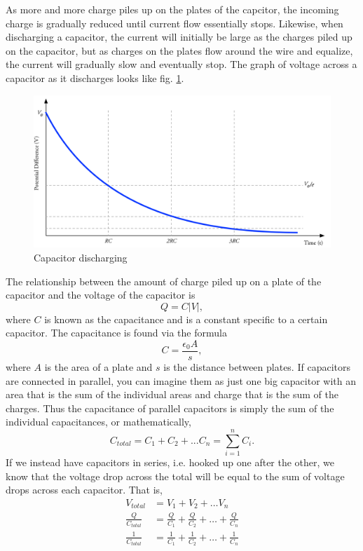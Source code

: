 \documentclass[nobib]{tufte-handout}
\begin{document}
As more and more charge piles up on the plates of the capcitor, the incoming charge is 
gradually reduced until current flow essentially stops. Likewise, when discharging a capacitor, 
the current will initially be large as the charges piled up on the capacitor, but as charges 
on the plates flow around the wire and equalize, the current will gradually slow and eventually stop. 
The graph of voltage across a capacitor as it discharges looks like fig. \ref{fig:capdis}.
\begin{figure}
    \center 
    \caption{Capacitor discharging}
    \label{fig:capdis}
    \includegraphics{images/Capacitor-discharge-curve.png}
\end{figure}
The relationship between the amount of charge piled up 
on a plate of the capacitor and the voltage of the capacitor is 
\[Q = C|V|,\]
where $C$ is known as the capacitance and is a constant specific to 
a certain capacitor. 
The capacitance is found via the formula 
\[C = \frac{\epsilon_0 A}{s},\]
where $A$ is the area of a plate and $s$ is the distance between plates. 
If capacitors are connected in parallel, you can imagine them as just one 
big capacitor with an area that is the sum of the individual areas and 
charge that is the sum of the charges. Thus the capacitance of parallel
capacitors is simply the sum of the individual capacitances, or mathematically, 
\[C_{total} = C_1 + C_2 + ... C_n = \sum_{i=1}^{n} C_i.\]
If we instead have capacitors in series, i.e. hooked up one after the other, 
we know that the voltage drop across the total will be equal to 
the sum of voltage drops across each capacitor. That is, 
\begin{align*}
    V_{total} &= V_1 + V_2 + \dots V_n \\
    \frac{Q}{C_{total}} &= \frac{Q}{C_1} + \frac{Q}{C_2} + \dots + \frac{Q}{C_n} \\
    \frac{1}{C_{total}} &= \frac{1}{C_1} + \frac{1}{C_2} + \dots + \frac{1}{C_n}
\end{align*}
\end{document}
